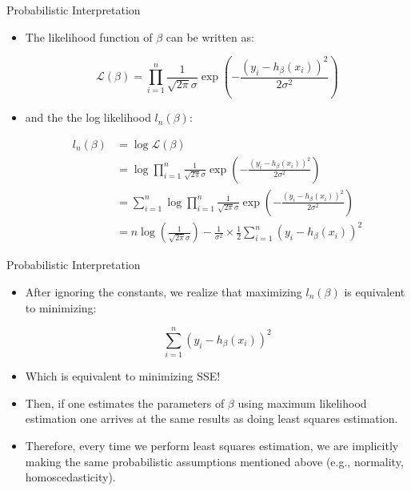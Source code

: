 \documentclass[handout]{beamer}
\begin{document}
\begin{frame}{Probabilistic Interpretation}
\scriptsize{
\begin{itemize}



 \item The likelihood function of $\beta$ can be written as:
 
 \begin{displaymath}
  \mathcal{L}(\beta) = \prod_{i=1}^{n}\frac{1}{\sqrt{2\pi} \sigma} \exp \left(- \frac{(y_i - h_{\beta}(x_{i}) )^{2}}{2\sigma^2}\right)
 \end{displaymath}

 \item and the the log likelihood $l_n(\beta)$:
 
   \begin{align}
l_n(\beta)  & =  \log  \mathcal{L}(\beta) \\
 & = \log \prod_{i=1}^{n}\frac{1}{\sqrt{2\pi} \sigma} \exp \left(- \frac{(y_i - h_{\beta}(x_{i}) )^{2}}{2\sigma^2}\right) \\
  & = \sum_{i=1}^n  \log \prod_{i=1}^{n}\frac{1}{\sqrt{2\pi} \sigma} \exp \left(- \frac{(y_i - h_{\beta}(x_{i}) )^{2}}{2\sigma^2}\right) \\
    & = n \log\left(\frac{1}{\sqrt{2\pi} \sigma}\right) - \frac{1}{\sigma^2}\times \frac{1}{2}\sum_{i=1}^n(y_i - h_{\beta}(x_{i}) )^{2}  
 \end{align}
 

\end{itemize}


}
 
\end{frame}


\begin{frame}{Probabilistic Interpretation}
\scriptsize{
\begin{itemize}



 \item After ignoring the constants, we realize that maximizing $l_n(\beta)$ is equivalent to minimizing:
 
 \begin{displaymath}
\sum_{i=1}^n(y_i - h_{\beta}(x_{i}))^{2}
 \end{displaymath}

 \item Which is equivalent to minimizing SSE!
 
 \item  Then, if one estimates the parameters of $\beta$ using maximum likelihood estimation one arrives at the same results as doing least squares estimation.
 \item Therefore, every time we perform least squares estimation, we are implicitly making the same probabilistic assumptions mentioned above (e.g., normality, homoscedasticity).

\end{itemize}


}
 
\end{frame}
\end{document}
